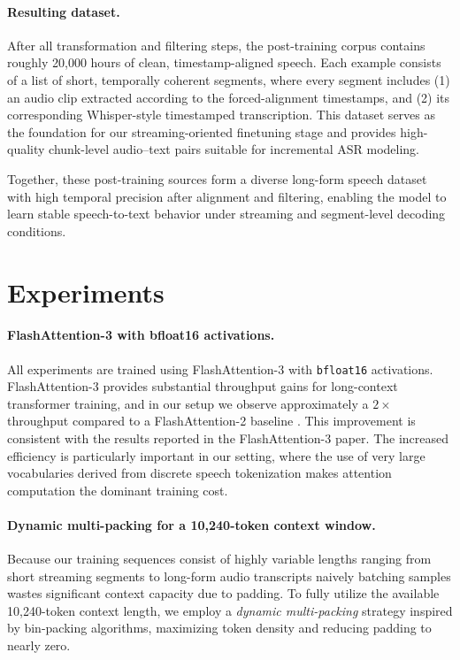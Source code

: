 \documentclass{article}
\begin{document}
\paragraph{Resulting dataset.}
After all transformation and filtering steps, the post-training corpus contains roughly 20{,}000 hours of clean, timestamp-aligned speech. Each example consists of a list of short, temporally coherent segments, where every segment includes (1) an audio clip extracted according to the forced-alignment timestamps, and (2) its corresponding Whisper-style timestamped transcription. This dataset serves as the foundation for our streaming-oriented finetuning stage and provides high-quality chunk-level audio--text pairs suitable for incremental ASR modeling.

Together, these post-training sources form a diverse long-form speech dataset with high temporal precision after alignment and filtering, enabling the model to learn stable speech-to-text behavior under streaming and segment-level decoding conditions.

\section{Experiments}

\paragraph{FlashAttention-3 with bfloat16 activations.}
All experiments are trained using FlashAttention-3 \citep{shah2024flashattention3fastaccurateattention} with \texttt{bfloat16} activations. FlashAttention-3 provides substantial throughput gains for long-context transformer training, and in our setup we observe approximately a $2\times$ throughput compared to a FlashAttention-2 baseline \citep{dao2023flashattention2fasterattentionbetter}. This improvement is consistent with the results reported in the FlashAttention-3 paper. The increased efficiency is particularly important in our setting, where the use of very large vocabularies derived from discrete speech tokenization makes attention computation the dominant training cost.

\paragraph{Dynamic multi-packing for a 10{,}240-token context window.}
Because our training sequences consist of highly variable lengths ranging from short streaming segments to long-form audio transcripts naively batching samples wastes significant context capacity due to padding. To fully utilize the available 10{,}240-token context length, we employ a \emph{dynamic multi-packing} strategy inspired by bin-packing algorithms, maximizing token density and reducing padding to nearly zero.
\end{document}

